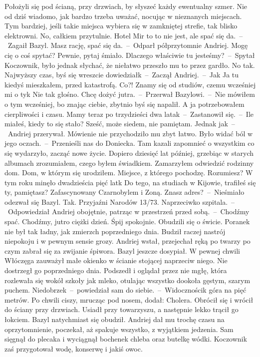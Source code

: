 \documentclass[../MAIN.tex]{subfiles}
\begin{document}
Położyli się pod ścianą, przy drzwiach, by słyszeć każdy ewentualny szmer. Nie od dziś wiadomo, jak bardzo trzeba uważać, nocując w nieznanych miejscach. Tym bardziej, jeśli takie miejsca wybiera się w zamkniętej strefie, tak blisko elektrowni.
\sx
No, całkiem przytulnie. Hotel Mir to to nie jest, ale spać się da.~--~Zagaił Bazyl.
\xx Masz rację, spać się da.~--~Odparł półprzytomnie Andriej.
\xx Mogę cię o coś spytać?
\xx Pewnie, pytaj śmiało.
\xx Dlaczego właściwie tu jesteśmy?~--~Spytał Koczownik, było jednak słychać, że niełatwo przeszło mu to przez gardło.
\xx No tak. Najwyższy czas, byś się wreszcie dowiedział\3k~--~Zaczął Andriej.~--~Ja\3k Ja tu kiedyś mieszkałem, przed katastrofą.
\xx Co?! Znamy się od studiów, czemu wcześniej mi o ty\3k
\xx Nie tak głośno. Chcę dożyć jutra.~--~Przerwał Bazylowi.~--~Nie mówiłem o tym wcześniej, bo znając ciebie, zbytnio byś się napalił. A ja potrzebowałem cierpliwości i czasu.%
\xx Mamy teraz po trzydzieści dwa lata\3k~--~Zastanowił się.~--~Ile miałeś, kiedy to się stało?%
\xx Sześć, może siedem, nie pamiętam. Jednak ja\3k~--~Andriej przerywał. Mówienie nie przychodziło mu zbyt łatwo. Było widać ból w jego oczach.~--~Przenieśli nas do Doniecka. Tam kazali zapomnieć o wszystkim co się wydarzyło, zacząć nowe życie. Dopiero dziesięć lat później, grzebiąc w starych albumach zrozumiałem, czego byłem świadkiem. Zamarzyłem odwiedzić rodzinny dom. Dom, w którym się urodziłem. Miejsce, z którego pochodzę. Rozumiesz? W tym roku minęło dwadzieścia pięć lat\3k Do tego, na studiach w Kijowie, trafiłeś się ty, pamiętasz? Zafascynowany Czarnobylem i Zoną.
\xx Znasz adres?~--~Nieśmiało odezwał się Bazyl.
\xx Tak. Przyjaźni Narodów 13/73. Naprzeciwko szpitala.~--~Odpowiedział Andriej obojętnie, patrząc w przestrzeń przed sobą.~--~Chodźmy spać.
\xx Chodźmy, jutro ciężki dzień. Śpij spokojnie.
\qd
{}
Obudzili się o świcie. Poranek nie był tak ładny, jak zmierzch poprzedniego dnia. Budził raczej nastrój niepokoju i w pewnym sensie grozy. Andriej wstał, przejechał ręką po twarzy po czym zabrał się za zwijanie śpiwora. Bazyl jeszcze dosypiał. W pewnej chwili Włóczęga zauważył małe okienko w ścianie stojącej naprzeciw niego. Nie dostrzegł go poprzedniego dnia. Podszedł i oglądał przez nie mgłę, która rozlewała się wokół szkoły jak mleko, otulając wszystko dookoła gęstym, szarym puchem.
\sx
Niedobrze\3k~--~powiedział sam do siebie.~--~Widoczności\3k góra na pięć metrów.
\qm
Po chwili ciszy, mrucząc pod nosem, dodał:
\sx Cholera.
\qd
Obrócił się i wrócił do ściany przy drzwiach. Usiadł przy towarzyszu, a następnie lekko trącił go łokciem. Bazyl natychmiast się obudził. Andriej dał mu trochę czasu na oprzytomnienie, poczekał, aż spakuje wszystko, z wyjątkiem jedzenia. Sam sięgnął do plecaka i wyciągnął bochenek chleba oraz butelkę wódki. Koczownik zaś przygotował wodę, konserwę i jakiś owoc.
\end{document}
